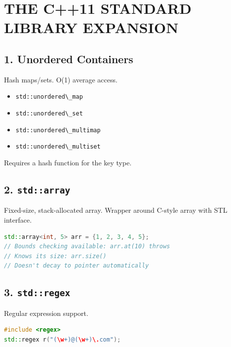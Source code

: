 \hypertarget{the-c11-standard-library-expansion}{%
\chapter{THE C++11 STANDARD LIBRARY
EXPANSION}\label{the-c11-standard-library-expansion}}

\hypertarget{unordered-containers}{%
\section{1. Unordered Containers}\label{unordered-containers}}

Hash maps/sets. O(1) average access.

\begin{itemize}
\tightlist
\item
  \passthrough{\lstinline!std::unordered\_map!}
\item
  \passthrough{\lstinline!std::unordered\_set!}
\item
  \passthrough{\lstinline!std::unordered\_multimap!}
\item
  \passthrough{\lstinline!std::unordered\_multiset!}
\end{itemize}

Requires a hash function for the key type.

\hypertarget{stdarray}{%
\section{\texorpdfstring{2.
\texttt{std::array}}{2. std::array}}\label{stdarray}}

Fixed-size, stack-allocated array. Wrapper around C-style array with STL
interface.

\begin{lstlisting}[language={C++}]
std::array<int, 5> arr = {1, 2, 3, 4, 5};
// Bounds checking available: arr.at(10) throws
// Knows its size: arr.size()
// Doesn't decay to pointer automatically
\end{lstlisting}

\hypertarget{stdregex}{%
\section{\texorpdfstring{3.
\texttt{std::regex}}{3. std::regex}}\label{stdregex}}

Regular expression support.

\begin{lstlisting}[language={C++}]
#include <regex>
std::regex r("(\w+)@(\w+)\.com");
\end{lstlisting}

